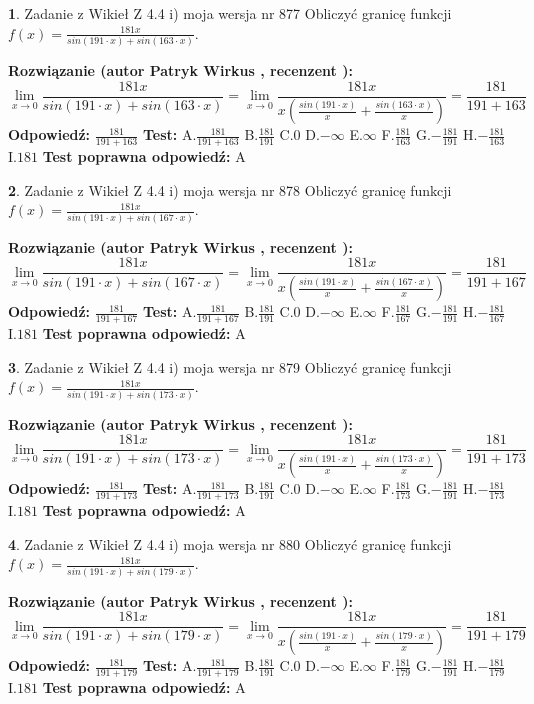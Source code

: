 \documentclass[12pt, a4paper]{article}
\theoremstyle{definition} %
\newtheorem{zad}{}
\newcommand{\zadStart}[1]{\begin{zad}#1\newline}
\newcommand{\zadStop}{\end{zad}}
\newcommand{\rozwStart}[2]{\noindent \textbf{Rozwiązanie (autor #1 , recenzent #2): }\newline}
\newcommand{\rozwStop}{\newline}
\newcommand{\odpStart}{\noindent \textbf{Odpowiedź:}\newline}
\newcommand{\odpStop}{\newline}
\newcommand{\testStart}{\noindent \textbf{Test:}\newline}
\newcommand{\testStop}{\newline}
\newcommand{\kluczStart}{\noindent \textbf{Test poprawna odpowiedź:}\newline}
\newcommand{\kluczStop}{\newline}
\begin{document}
\zadStart{Zadanie z Wikieł Z 4.4 i) moja wersja nr 877}
Obliczyć granicę funkcji $f(x)=\frac{181x}{sin(191\cdot x) +sin(163\cdot x)}$.
\zadStop
\rozwStart{Patryk Wirkus}{}
$$\lim\limits_{x\to 0}\frac{181x}{sin(191\cdot x) +sin(163\cdot x)}=\lim\limits_{x\to 0}\frac{181x}{x(\frac{sin(191\cdot x)}{x}+\frac{sin(163\cdot x)}{x})}=\frac{181}{191+163}$$
\rozwStop
\odpStart
$\frac{181}{191+163}$
\odpStop
\testStart
A.$\frac{181}{191+163}$
B.$\frac{181}{191}$
C.$0$
D.$-\infty$
E.$\infty$
F.$\frac{181}{163}$
G.$-\frac{181}{191}$
H.$-\frac{181}{163}$
I.$181$
\testStop
\kluczStart
A
\kluczStop



\zadStart{Zadanie z Wikieł Z 4.4 i) moja wersja nr 878}
Obliczyć granicę funkcji $f(x)=\frac{181x}{sin(191\cdot x) +sin(167\cdot x)}$.
\zadStop
\rozwStart{Patryk Wirkus}{}
$$\lim\limits_{x\to 0}\frac{181x}{sin(191\cdot x) +sin(167\cdot x)}=\lim\limits_{x\to 0}\frac{181x}{x(\frac{sin(191\cdot x)}{x}+\frac{sin(167\cdot x)}{x})}=\frac{181}{191+167}$$
\rozwStop
\odpStart
$\frac{181}{191+167}$
\odpStop
\testStart
A.$\frac{181}{191+167}$
B.$\frac{181}{191}$
C.$0$
D.$-\infty$
E.$\infty$
F.$\frac{181}{167}$
G.$-\frac{181}{191}$
H.$-\frac{181}{167}$
I.$181$
\testStop
\kluczStart
A
\kluczStop



\zadStart{Zadanie z Wikieł Z 4.4 i) moja wersja nr 879}
Obliczyć granicę funkcji $f(x)=\frac{181x}{sin(191\cdot x) +sin(173\cdot x)}$.
\zadStop
\rozwStart{Patryk Wirkus}{}
$$\lim\limits_{x\to 0}\frac{181x}{sin(191\cdot x) +sin(173\cdot x)}=\lim\limits_{x\to 0}\frac{181x}{x(\frac{sin(191\cdot x)}{x}+\frac{sin(173\cdot x)}{x})}=\frac{181}{191+173}$$
\rozwStop
\odpStart
$\frac{181}{191+173}$
\odpStop
\testStart
A.$\frac{181}{191+173}$
B.$\frac{181}{191}$
C.$0$
D.$-\infty$
E.$\infty$
F.$\frac{181}{173}$
G.$-\frac{181}{191}$
H.$-\frac{181}{173}$
I.$181$
\testStop
\kluczStart
A
\kluczStop



\zadStart{Zadanie z Wikieł Z 4.4 i) moja wersja nr 880}
Obliczyć granicę funkcji $f(x)=\frac{181x}{sin(191\cdot x) +sin(179\cdot x)}$.
\zadStop
\rozwStart{Patryk Wirkus}{}
$$\lim\limits_{x\to 0}\frac{181x}{sin(191\cdot x) +sin(179\cdot x)}=\lim\limits_{x\to 0}\frac{181x}{x(\frac{sin(191\cdot x)}{x}+\frac{sin(179\cdot x)}{x})}=\frac{181}{191+179}$$
\rozwStop
\odpStart
$\frac{181}{191+179}$
\odpStop
\testStart
A.$\frac{181}{191+179}$
B.$\frac{181}{191}$
C.$0$
D.$-\infty$
E.$\infty$
F.$\frac{181}{179}$
G.$-\frac{181}{191}$
H.$-\frac{181}{179}$
I.$181$
\testStop
\kluczStart
A
\kluczStop
\end{document}
